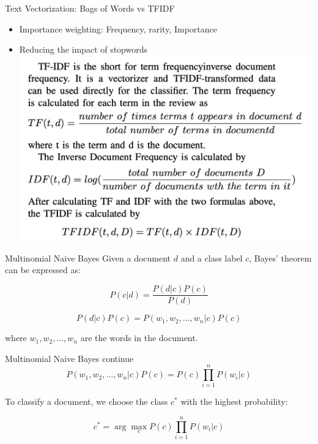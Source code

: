 \documentclass{beamer}
\begin{document}
\begin{frame}{Text Vectorization: Bags of Words vs TFIDF}
\begin{itemize}
\item Importance weighting: Frequency, rarity, Importance
\item Reducing the impact of stopwords 
\includegraphics[width=\textwidth]{3.png}
\end{itemize}

\end{frame}

\begin{frame}{Multinomial Naive Bayes}
Given a document $d$ and a class label $c$, Bayes' theorem can be expressed as:

\begin{equation}
P(c|d) = \frac{P(d|c)P(c)}{P(d)}
\end{equation}

\begin{equation}
P(d|c)P(c) = P(w_1, w_2, \dots, w_n|c)P(c)
\end{equation}

where $w_1, w_2, \dots, w_n$ are the words in the document.

\end{frame}

\begin{frame}{Multinomial Naive Bayes continue}
\begin{equation}
P(w_1, w_2, \dots, w_n|c)P(c) = P(c)\prod_{i=1}^{n} P(w_i|c)
\end{equation}

To classify a document, we choose the class $c^*$ with the highest probability:

\begin{equation}
c^* = \arg\max_c P(c)\prod_{i=1}^{n} P(w_i|c)
\end{equation}
\end{frame}
\end{document}
